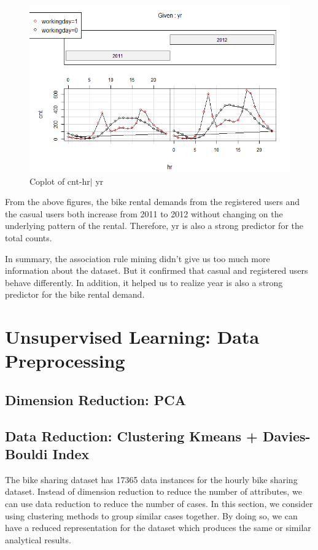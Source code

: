 \documentclass[12pt]{article}
\begin{document}
		\begin{figure}[H]
			\centering
			\includegraphics[width=\linewidth]{figures/cnt_year.png}
			\caption{Coplot of cnt-hr$|$ yr}
		\end{figure}
    From the above figures, the bike rental demands from the registered users and the casual users both increase from 2011 to 2012 without changing on the underlying pattern of the rental. Therefore, yr is also a strong predictor for the total counts.
    
    In summary, the association rule mining didn't give us too much more information about the dataset. But it confirmed that casual and registered users behave differently. In addition, it helped us to realize year is also a strong predictor for the bike rental demand. 
	\section{Unsupervised Learning: Data Preprocessing}
	\subsection{Dimension Reduction: PCA }
	\label{sec:dimension-reduction}
	
	\subsection{Data Reduction: Clustering Kmeans + Davies-Bouldi Index}
	\label{data-reduction}
	
	The bike sharing dataset has  17365 data instances for the hourly bike sharing dataset. Instead of dimension reduction to reduce the number of attributes, we can use data reduction to reduce the number of cases. In this section, we consider using clustering methods to group similar cases together. By doing so, we can have a reduced representation for the dataset which produces the same or similar analytical results.
\end{document}
